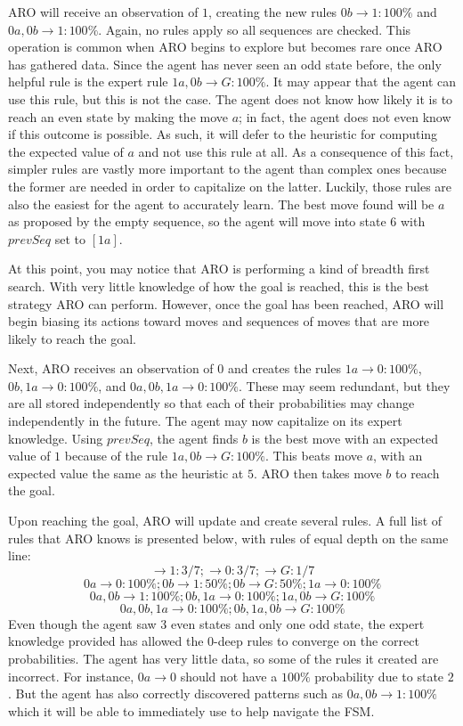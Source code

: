 \documentclass[letterpaper]{article} %
\begin{document}
ARO will receive an observation of $1$, creating the new rules $0b \rightarrow 1: 100\%$ and $0a, 0b \rightarrow 1: 100\%$. Again, no rules apply so all sequences are checked. This operation is common when ARO begins to explore but becomes rare once ARO has gathered data. Since the agent has never seen an odd state before, the only helpful rule is the expert rule $1a, 0b \rightarrow G: 100\%$. It may appear that the agent can use this rule, but this is not the case. The agent does not know how likely it is to reach an even state by making the move $a$; in fact, the agent does not even know if this outcome is possible. As such, it will defer to the heuristic for computing the expected value of $a$ and not use this rule at all. As a consequence of this fact, simpler rules are vastly more important to the agent than complex ones because the former are needed in order to capitalize on the latter. Luckily, those rules are also the easiest for the agent to accurately learn. The best move found will be $a$ as proposed by the empty sequence, so the agent will move into state $6$ with $prevSeq$ set to $[1a]$.

At this point, you may notice that ARO is performing a kind of breadth first search. With very little knowledge  of how the goal is reached, this is the best strategy ARO can perform. However, once the goal has been reached, ARO will begin biasing its actions toward moves and sequences of moves that are more likely to reach the goal. 

Next, ARO receives an observation of $0$ and creates the rules $1a \rightarrow 0: 100\%$, $0b, 1a \rightarrow 0: 100\%$, and $0a, 0b, 1a \rightarrow 0: 100\%$. These may seem redundant, but they are all stored independently so that each of their probabilities may change independently in the future. The agent may now capitalize on its expert knowledge. Using $prevSeq$, the agent finds $b$ is the best move with an expected value of $1$ because of the rule $1a, 0b \rightarrow G: 100\%$. This beats move $a$, with an expected value the same as the heuristic at $5$. ARO then takes move $b$ to reach the goal.

Upon reaching the goal, ARO will update and create several rules. A full list of rules that ARO knows is presented below, with rules of equal depth on the same line:
$$\rightarrow 1: 3/7; \rightarrow 0: 3/7; \rightarrow G: 1/7$$
$$0a \rightarrow 0: 100\%; 0b \rightarrow 1: 50\%; 0b \rightarrow G: 50\%; 1a \rightarrow 0: 100\%$$
$$0a, 0b \rightarrow 1: 100\%; 0b, 1a \rightarrow 0: 100\%; 1a, 0b \rightarrow G: 100\%$$
$$0a, 0b, 1a \rightarrow 0: 100\%; 0b, 1a, 0b \rightarrow G: 100\%$$
Even though the agent saw 3 even states and only one odd state, the expert knowledge provided has allowed the 0-deep rules to converge on the correct probabilities. The agent has very little data, so some of the rules it created are incorrect. For instance, $0a \rightarrow 0$ should not have a $100\%$ probability due to state $2$. But the agent has also correctly discovered patterns such as $0a, 0b \rightarrow 1: 100\%$ which it will be able to immediately use to help navigate the FSM.
\end{document}
